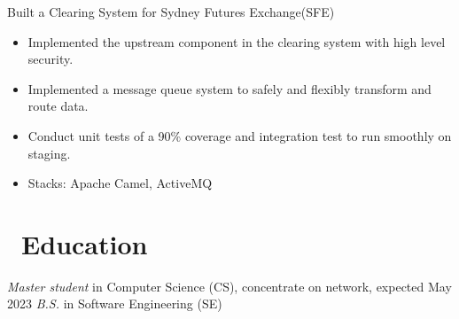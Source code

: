 \documentclass{resume}
\begin{document}
Built a Clearing System for Sydney Futures Exchange(SFE)
\begin{itemize}
  \item Implemented the upstream component in the clearing system with high level security.
  \item Implemented a message queue system to safely and flexibly transform and route data.
  \item Conduct unit tests of a 90\% coverage and integration test to run smoothly on staging.
  \item Stacks: Apache Camel, ActiveMQ
\end{itemize}

\section{\faGraduationCap\ Education}
\textit{Master student} in Computer Science (CS), concentrate on network, expected May 2023
\textit{B.S.} in Software Engineering (SE)




%
%
\end{document}
